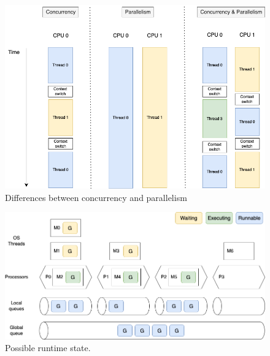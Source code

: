 \documentclass[
  digital,
  color,
  oneside,
  nosansbold,
  nocolorbold,
  lof,
  lot,
]{fithesis4}
\begin{document}
\begin{figure}[H]
    \centering
    \includegraphics[width=12cm]{figures/concurrency-parallelism.png}
    \caption{Differences between concurrency and parallelism}
\end{figure}

\begin{figure}[H]
    \centering
    \includegraphics[width=12cm]{figures/scheduling.png}
    \caption{Possible runtime state.}
\end{figure}
\end{document}
